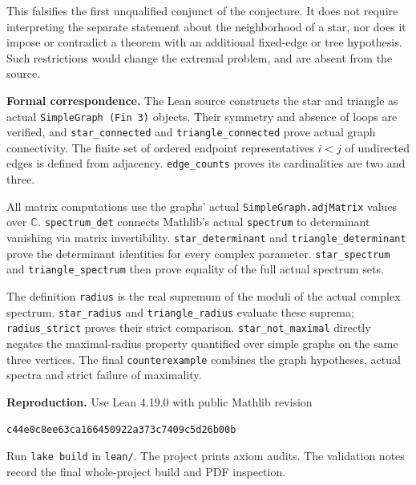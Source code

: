 \documentclass[11pt]{article}
\begin{document}
This falsifies the first unqualified conjunct of the conjecture.
It does not require interpreting the separate statement about the
neighborhood of a star, nor does it impose or contradict a theorem
with an additional fixed-edge or tree hypothesis. Such restrictions
would change the extremal problem, and are absent from the source.

\textbf{Formal correspondence.}
The Lean source constructs the star and triangle as actual
\texttt{SimpleGraph (Fin 3)} objects. Their symmetry and absence of
loops are verified, and \texttt{star\_connected} and
\texttt{triangle\_connected} prove actual graph connectivity.
The finite set of ordered endpoint representatives $i<j$ of undirected
edges is defined from adjacency. \texttt{edge\_counts} proves its
cardinalities are two and three.

All matrix computations use the graphs' actual
\texttt{SimpleGraph.adjMatrix} values over $\mathbb C$.
\texttt{spectrum\_det} connects Mathlib's actual \texttt{spectrum}
to determinant vanishing via matrix invertibility.
\texttt{star\_determinant} and \texttt{triangle\_determinant} prove
the determinant identities for every complex parameter.
\texttt{star\_spectrum} and \texttt{triangle\_spectrum} then prove
equality of the full actual spectrum sets.

The definition \texttt{radius} is the real supremum of the moduli
of the actual complex spectrum.
\texttt{star\_radius} and \texttt{triangle\_radius} evaluate these
suprema; \texttt{radius\_strict} proves their strict comparison.
\texttt{star\_not\_maximal} directly negates the maximal-radius
property quantified over simple graphs on the same three vertices.
The final \texttt{counterexample} combines the graph hypotheses,
actual spectra and strict failure of maximality.

\textbf{Reproduction.}
Use Lean 4.19.0 with public Mathlib revision
\begin{center}\small\texttt{c44e0c8ee63ca166450922a373c7409c5d26b00b}\end{center}
Run \texttt{lake build} in \texttt{lean/}. The project prints axiom audits.
The validation notes record the final whole-project build and PDF inspection.
\end{document}
